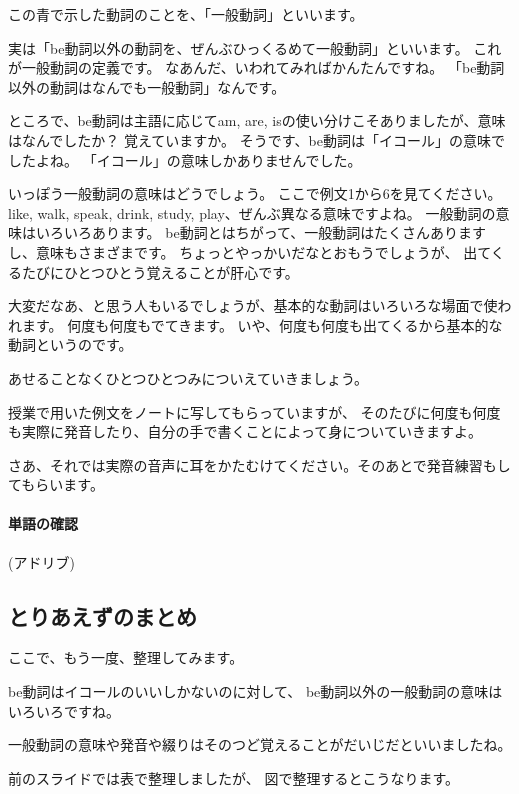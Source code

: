 \documentclass[book,jafontscale=0.9247]{jlreq}
\newcommand{\myMouse}{%
  {\large \ComputerMouse}
}
\begin{document}
この青で示した動詞のことを、「一般動詞」といいます。

実は「be動詞以外の動詞を、ぜんぶひっくるめて一般動詞」といいます。
これが一般動詞の定義です。
なあんだ、いわれてみればかんたんですね。
「be動詞以外の動詞はなんでも一般動詞」なんです。

ところで、be動詞は主語に応じてam, are, isの使い分けこそありましたが、意味はなんでしたか？
覚えていますか。
そうです、be動詞は「イコール」の意味でしたよね。
「イコール」の意味しかありませんでした。

いっぽう一般動詞の意味はどうでしょう。
ここで例文1から6を見てください。
like, walk, speak, drink, study, play、ぜんぶ異なる意味ですよね。
一般動詞の意味はいろいろあります。
be動詞とはちがって、一般動詞はたくさんありますし、意味もさまざまです。
ちょっとやっかいだなとおもうでしょうが、
出てくるたびにひとつひとう覚えることが肝心です。

大変だなあ、と思う人もいるでしょうが、基本的な動詞はいろいろな場面で使われます。
何度も何度もでてきます。
いや、何度も何度も出てくるから基本的な動詞というのです。

あせることなくひとつひとつみについえていきましょう。

授業で用いた例文をノートに写してもらっていますが、
そのたびに何度も何度も実際に発音したり、自分の手で書くことによって身についていきますよ。

さあ、それでは実際の音声に耳をかたむけてください。そのあとで発音練習もしてもらいます。

\paragraph{単語の確認}

(アドリブ)

\myMouse

\subsection{とりあえずのまとめ}

ここで、もう一度、整理してみます。

be動詞はイコールのいいしかないのに対して、
be動詞以外の一般動詞の意味はいろいろですね。

一般動詞の意味や発音や綴りはそのつど覚えることがだいじだといいましたね。

\myMouse

前のスライドでは表で整理しましたが、
図で整理するとこうなります。
\end{document}
